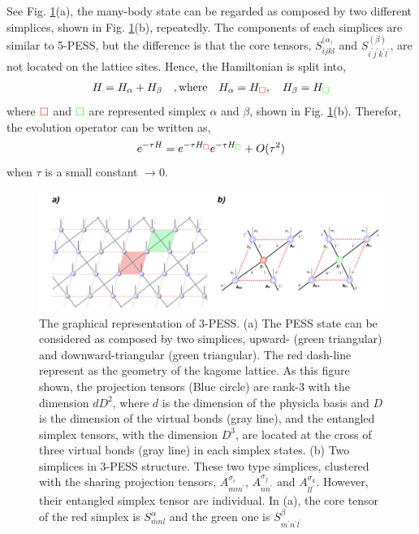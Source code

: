 See Fig. \ref{fig4325}(a), the many-body state can be regarded as composed by two different simplices, shown in Fig. \ref{fig4325}(b), repeatedly. The components of each simplices are similar to 5-PESS, but the difference is that the core tensors, $S^{(\alpha_)}_{ijkl}$ and $S^{(\beta)}_{i^{\prime}j^{\prime}k^{\prime}l^{\prime}}$, are not located on the lattice sites. Hence, the Hamiltonian is split into,
\begin{align}
	H = H_{\alpha} + H_{\beta} \quad,\text{where} \quad H_{\alpha} = H_{\color{red} \square},\quad H_{\beta} = H_{\color{green} \square}
\end{align}
where ${\color{red} \square}$ and ${\color{green} \square}$ are represented simplex $\alpha$ and $\beta$, shown in Fig. \ref{fig4325}(b). Therefor, the evolution operator can be written as, 
\begin{align}
	e^{-\tau H} = e^{-\tau H_{\color{red} \square}} e^{-\tau H_{ \color{green} \square}} + O(\tau^2)
\end{align}
when $\tau$ is a small constant $\rightarrow 0$.
\begin{figure}[ht]
	\centering
	\includegraphics[width=1.00\textwidth]{figures/fig4325.png}
	\caption[The graphical representation of 3-PESS]{The graphical representation of 3-PESS. (a) The PESS state can be considered as composed by two simplices, upward- (green triangular) and downward-triangular (green triangular). The red dash-line represent as the geometry of the kagome lattice. As this figure shown, the projection tensors (Blue circle) are rank-3 with the dimension $dD^2$, where $d$ is the dimension of the physicla basis and $D$ is the dimension of the virtual bonds (gray line), and the entangled simplex tensors, with the dimension $D^3$, are located at the cross of three virtual bonds (gray line) in each simplex states. (b) Two simplices in 3-PESS structure. These two type simplices, clustered with the sharing projection tensors, $A^{\sigma_i}_{mm^{\prime}}$, $A^{\sigma_j}_{nn^{\prime}}$ and $A^{\sigma_k}_{ll^{\prime}}$. However, their entangled simplex tensor are individual. In (a), the core tensor of the red simplex is $S^{\alpha}_{mnl}$ and the green one is $S^{\beta}_{m^{\prime}n^{\prime}l^{\prime}}$}
	\label{fig4325}
\end{figure}

